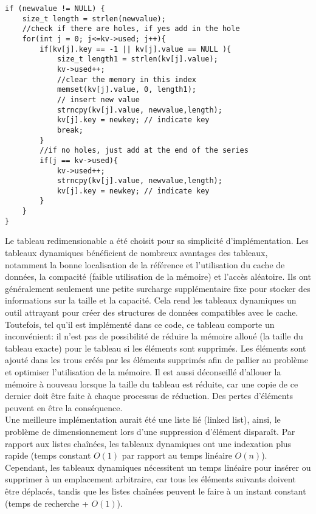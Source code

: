 \documentclass[11pt,a4paper]{article}
\begin{document}
\begin{lstlisting}
if (newvalue != NULL) {
	size_t length = strlen(newvalue);
	//check if there are holes, if yes add in the hole
	for(int j = 0; j<=kv->used; j++){
		if(kv[j].key == -1 || kv[j].value == NULL ){
			size_t length1 = strlen(kv[j].value);
			kv->used++;
			//clear the memory in this index
			memset(kv[j].value, 0, length1); 
			// insert new value
			strncpy(kv[j].value, newvalue,length); 
			kv[j].key = newkey; // indicate key
			break;
		}
		//if no holes, just add at the end of the series
		if(j == kv->used){
			kv->used++;
			strncpy(kv[j].value, newvalue,length); 
			kv[j].key = newkey; // indicate key
		}
	}
}
\end{lstlisting}

Le tableau redimensionable a été choisit pour sa simplicité d'implémentation. Les tableaux dynamiques bénéficient de nombreux avantages des tableaux, notamment la bonne localisation de la référence et l'utilisation du cache de données, la compacité (faible utilisation de la mémoire) et l'accès aléatoire. Ils ont généralement seulement une petite surcharge supplémentaire fixe pour stocker des informations sur la taille et la capacité. Cela rend les tableaux dynamiques un outil attrayant pour créer des structures de données compatibles avec le cache.\\
Toutefois, tel qu'il est implémenté dans ce code, ce tableau comporte un inconvénient: il n'est pas de possibilité de réduire la mémoire alloué (la taille du tableau exacte) pour le tableau si les éléments sont supprimés. Les éléments sont ajouté dans les trous créés par les éléments supprimés afin de pallier au problème et optimiser l'utilisation de la mémoire. Il est aussi déconseillé d'allouer la mémoire à nouveau lorsque la taille du tableau est réduite, car une copie de ce dernier doit être faite à chaque processus de réduction. Des pertes d'éléments peuvent en être la conséquence.\\
Une meilleure implémentation aurait été une liste lié (linked list), ainsi, le problème de dimensionnement lors d'une suppression d'élément disparaît. Par rapport aux listes chaînées, les tableaux dynamiques ont une indexation plus rapide (temps constant $O(1)$ par rapport au temps linéaire $O(n)$). Cependant, les tableaux dynamiques nécessitent un temps linéaire pour insérer ou supprimer à un emplacement arbitraire, car tous les éléments suivants doivent être déplacés, tandis que les listes chaînées peuvent le faire à un instant constant (temps de recherche + $O(1)$).
\end{document}
